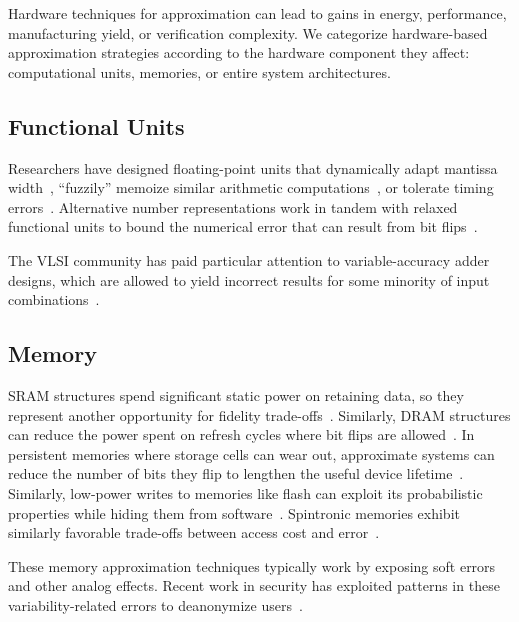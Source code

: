 Hardware techniques for approximation can lead to gains in energy, performance, manufacturing
yield, or verification complexity.
We categorize hardware-based approximation strategies according to the
hardware component they affect: computational units, memories, or entire
system architectures.

\subsection{Functional Units}

Researchers have designed floating-point units
that dynamically adapt mantissa width~\cite{bitwidthred, hierarchfpu}, ``fuzzily'' memoize
similar arithmetic computations~\cite{fuzzymemo}, or tolerate timing
errors~\cite{kumarhpca, hizli, metafunctions}.
Alternative number
representations work in tandem with relaxed functional units to bound the
numerical error that can result from bit flips~\cite{stanleymarbell}.

The VLSI community has paid particular attention to variable-accuracy adder
designs, which are allowed to yield incorrect results for some minority of
input combinations~\cite{uva-adder, palem-adders, impact, adder-metrics,
configurable-adder, adder-iccad13, adder-tcad, adder-optimal, adder-dac12,
adder-isic09, adder-date08}.

\subsection{Memory}

SRAM
structures spend significant static power on retaining data, so they represent
another opportunity for fidelity trade-offs~\cite{hybrid-sram, sramerrors,
partially-forgetful}. Similarly,
DRAM structures can reduce the power spent on refresh cycles where bit flips
are allowed~\cite{flikker, sparkk}.
In persistent memories where storage cells can wear out, approximate systems
can reduce the number of bits they flip to lengthen the useful device
lifetime~\cite{fang-pcm}.
Similarly, low-power writes to memories like flash can exploit its
probabilistic properties while hiding them from software~\cite{halfwits,
powerfade, flash-retention-relax}.
Spintronic memories exhibit similarly favorable trade-offs between access cost
and error~\cite{spintronic-approx}.

These memory approximation techniques typically
work by exposing
soft errors and other analog effects.
Recent work in security has exploited patterns in these variability-related
errors to deanonymize users~\cite{deanondram}.

